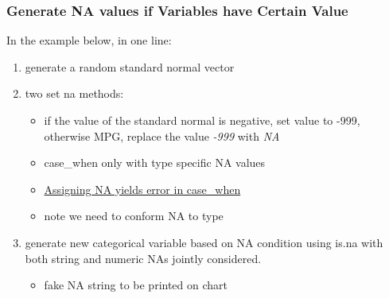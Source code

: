 \documentclass[
]{book}
\providecommand{\tightlist}{%
  \setlength{\itemsep}{0pt}\setlength{\parskip}{0pt}}
\begin{document}
\hypertarget{generate-na-values-if-variables-have-certain-value}{%
\subsubsection{Generate NA values if Variables have Certain Value}\label{generate-na-values-if-variables-have-certain-value}}

In the example below, in one line:

\begin{enumerate}
\def\labelenumi{\arabic{enumi}.}
\tightlist
\item
  generate a random standard normal vector
\item
  two set na methods:

  \begin{itemize}
  \tightlist
  \item
    if the value of the standard normal is negative, set value to -999, otherwise MPG, replace the value \emph{-999} with \emph{NA}
  \item
    case\_when only with type specific NA values
  \item
    \href{https://github.com/tidyverse/dplyr/issues/3202\#issuecomment-343601409}{Assigning NA yields error in case\_when}
  \item
    note we need to conform NA to type
  \end{itemize}
\item
  generate new categorical variable based on NA condition using is.na with both string and numeric NAs jointly considered.

  \begin{itemize}
  \tightlist
  \item
    fake NA string to be printed on chart
  \end{itemize}
\end{enumerate}
\end{document}
